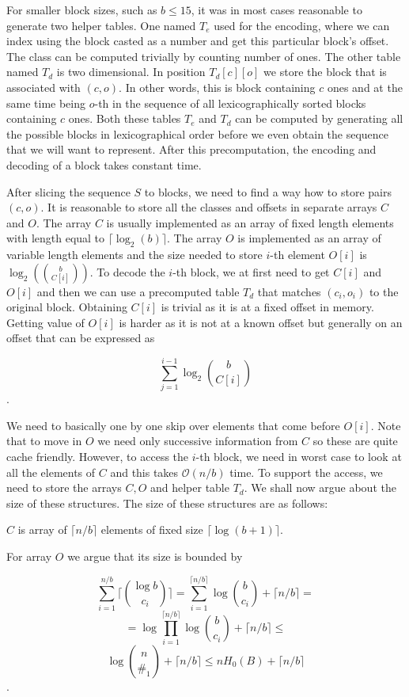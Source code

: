 For smaller block sizes, such as $b\leq 15$, it was in most cases reasonable to
generate two helper tables. One named $T_e$ used for the encoding, where we can
index using the block casted as a number and get this particular block's offset.
The class can be computed trivially by counting number of ones. The other table
named $T_d$ is two dimensional. In position $T_d[c][o]$ we store the block that
is associated with $(c, o)$. In other words, this is block containing $c$ ones
and at the same time being $o$-th in the sequence of all lexicographically sorted
blocks containing $c$ ones. Both these tables $T_e$ and $T_d$ can be computed
by generating all the possible blocks in lexicographical order before we even
obtain the sequence that we will want to represent. After this precomputation,
the encoding and decoding of a block takes constant time.

After slicing the sequence $S$ to blocks, we need to find a way how to store
pairs $(c, o)$. It is reasonable to store all the classes and offsets in separate
arrays $C$ and $O$. The array $C$ is usually implemented as an array of fixed length
elements with length equal to $\lceil \log_2(b)\rceil$. The array $O$ is implemented as an
array of variable length elements and the size needed to store $i$-th element $O[i]$ is
$\log_2({b\choose C[i]})$. To decode the $i$-th block, we at first need to get
$C[i]$ and $O[i]$ and then we can use a precomputed table $T_d$ that matches $(c_i, o_i)$
to the original block. Obtaining $C[i]$ is trivial as it is at a fixed offset in
memory. Getting value of $O[i]$ is harder as it is not at a known offset but generally
on an offset that can be expressed as

                $$\sum_{j=1}^{i-1} \log_2{b\choose C[i]}$$.

We need to basically one by one skip over elements that come before $O[i]$.
Note that to move in $O$ we need only successive information from $C$ so these
are quite cache friendly. However, to access the $i$-th block, we need in worst
case to look at all the elements of $C$ and this takes $\mathcal{O}(n/b)$ time. To support
the access, we need to store the arrays $C, O$ and helper table $T_d$. We shall
now argue about the size of these structures. The size of these structures are
as follows:

$C$ is array of $\lceil n/b \rceil$ elements of fixed size $\lceil \log(b+1) \rceil$.

For array $O$ we argue that its size is bounded by

$$\sum_{i=1}^{n/b} \bigg\lceil{\log b\choose c_i}\bigg\rceil =
\sum_{i=1}^{\lceil n/b \rceil} \log {b\choose c_i} + \lceil n/b \rceil =$$
$$=\log\prod_{i=1}^{\lceil n/b \rceil} \log {b\choose c_i} + \lceil n/b \rceil \leq $$
$$\log{n\choose \#_1} +  \lceil n/b \rceil \leq nH_0(B) +  \lceil n/b \rceil$$.

